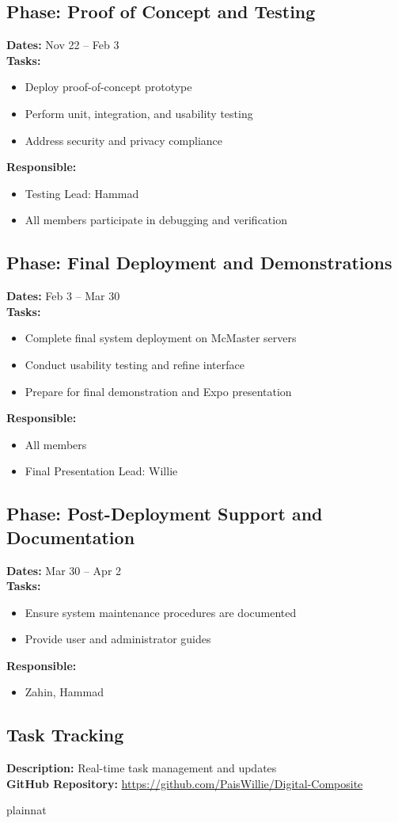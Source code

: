 \documentclass[12pt, titlepage]{article}
\begin{document}
\subsection{Phase: Proof of Concept and Testing}
\textbf{Dates:} Nov 22 – Feb 3 \\
\textbf{Tasks:}
\begin{itemize}
  \item Deploy proof-of-concept prototype
  \item Perform unit, integration, and usability testing
  \item Address security and privacy compliance
\end{itemize}
\textbf{Responsible:}
\begin{itemize}
  \item Testing Lead: Hammad
  \item All members participate in debugging and verification
\end{itemize}

\subsection{Phase: Final Deployment and Demonstrations}
\textbf{Dates:} Feb 3 – Mar 30 \\
\textbf{Tasks:}
\begin{itemize}
  \item Complete final system deployment on McMaster servers
  \item Conduct usability testing and refine interface
  \item Prepare for final demonstration and Expo presentation
\end{itemize}
\textbf{Responsible:}
\begin{itemize}
  \item All members
  \item Final Presentation Lead: Willie
\end{itemize}

\subsection{Phase: Post-Deployment Support and Documentation}
\textbf{Dates:} Mar 30 – Apr 2 \\
\textbf{Tasks:}
\begin{itemize}
  \item Ensure system maintenance procedures are documented
  \item Provide user and administrator guides
\end{itemize}
\textbf{Responsible:}
\begin{itemize}
  \item Zahin, Hammad
\end{itemize}

\subsection{Task Tracking}
\textbf{Description:} Real-time task management and updates \\
\textbf{GitHub Repository:} \url{https://github.com/PaisWillie/Digital-Composite}

 {plainnat}


\newpage{}
\end{document}
